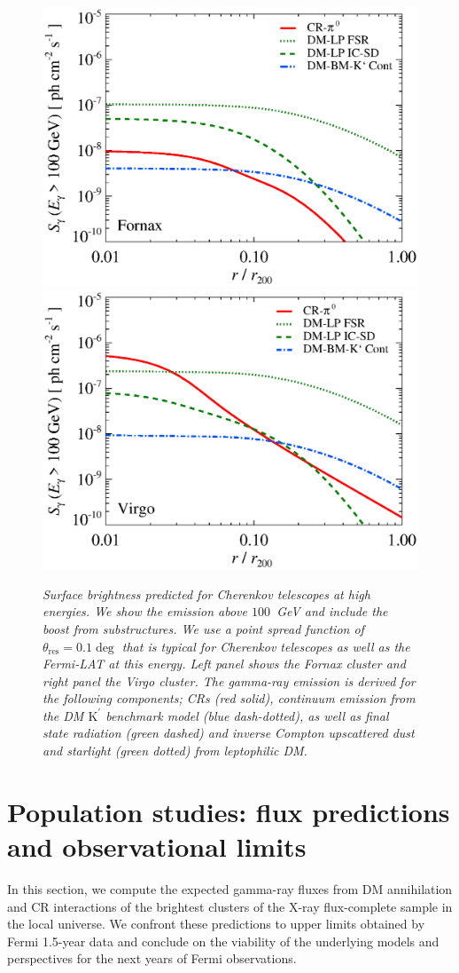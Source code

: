 \documentclass[10pt,aps,pra,reprint,amsmath,amsfonts,amssymb,showpacs,nofootinbib,floatfix]{revtex4-1}
\newcommand{\rmn}{\mathrm}
\newcommand{\psf}{\theta_\rmn{res}}
\newcommand{\Kp}{\rmn{K}^\prime}
\begin{document}
\begin{figure}
\begin{minipage}{2.0\columnwidth}
  \includegraphics[width=0.49\columnwidth]{figures/SB.Fornax.v13.SF700.SubMass.elmu.eps}
  \includegraphics[width=0.49\columnwidth]{figures/SB.Virgo.v13.SF700.SubMass.elmu.eps}
\caption{\it Surface brightness predicted for Cherenkov telescopes at
  high energies. We show the emission above $100$~GeV and include the
  boost from substructures. We use a point spread function of
  $\psf=0.1\deg$ that is typical for Cherenkov
  telescopes as well as the Fermi-LAT at this energy. Left panel shows
  the Fornax cluster and right panel the Virgo cluster. The gamma-ray
  emission is derived for the following components; CRs (red solid),
  continuum emission from the DM $\Kp$ benchmark model (blue
  dash-dotted), as well as final state radiation (green dashed) and
  inverse Compton upscattered dust and starlight (green dotted) from
  leptophilic DM.}
 \label{fig:SB_IACTs}
\end{minipage}
\end{figure}



\section{Population studies: flux predictions and observational limits}

In this section, we compute the expected gamma-ray fluxes from DM
annihilation and CR interactions of the brightest clusters of the
X-ray flux-complete sample in the local universe. We confront these
predictions to upper limits obtained by Fermi 1.5-year data and
conclude on the viability of the underlying models and perspectives
for the next years of Fermi observations.
\end{document}
